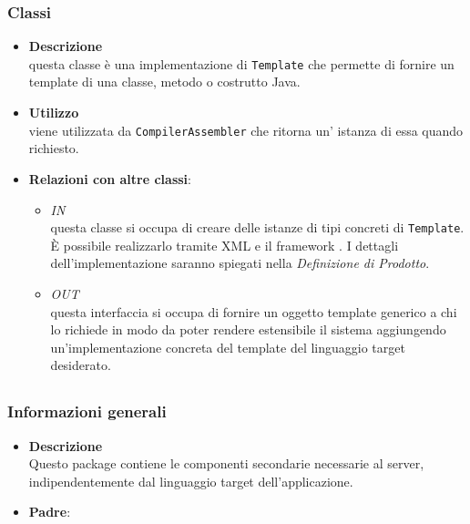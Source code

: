 \subsubsection{Classi}
\label{\nogloxy{swedesigner::server::template::java::JavaTemplate}}
\begin{itemize}
\item \textbf{Descrizione}\\
questa classe è una implementazione di \texttt{Template} che permette di fornire un template di una classe, metodo o costrutto Java.
\item \textbf{Utilizzo}\\
viene utilizzata da \texttt{CompilerAssembler} che ritorna un' istanza di essa quando richiesto.
\item \textbf{Relazioni con altre classi}:
\begin{itemize}
\item \textit{IN} \hyperref[\nogloxy{swedesigner::server::template::TemplateAssembler}]{}\\
questa classe si occupa di creare delle istanze di tipi concreti di \texttt{Template}. È possibile realizzarlo tramite XML e il framework \spring. I dettagli dell'implementazione saranno spiegati nella \emph{Definizione di Prodotto}. %
\item \textit{OUT} \hyperref[\nogloxy{swedesigner::server::template::Template}]{}\\
questa interfaccia si occupa di fornire un oggetto template generico a chi lo richiede in modo da poter rendere estensibile il sistema aggiungendo un'implementazione concreta del template del linguaggio target desiderato.
\end{itemize}
\end{itemize}
\subsection{}
\label{\nogloxy{swedesigner::server::utility}}
\subsubsection{Informazioni generali}
\begin{itemize}
\item \textbf{Descrizione}\\
Questo package contiene le componenti secondarie necessarie al server, indipendentemente dal linguaggio target dell'applicazione.
\item \textbf{Padre}: \hyperref[\nogloxy{swedesigner::server}]{}
\end{itemize}
